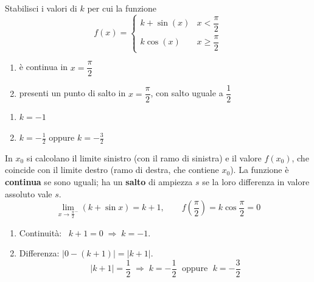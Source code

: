 \begin{question}[ID=4.5, subtitle={Continuità e salto di $f$ con $k+\sin x$ e $k\cos x$ in $x=\pi/2$}, tags={continuità, parametrico}, difficulty=media]
Stabilisci i valori di $k$ per cui la funzione
\[
f(x) = \begin{cases}
    k + \sin(x) & x < \dfrac{\pi}{2} \\
    k\cos(x) & x \ge \dfrac{\pi}{2}
\end{cases}
\]
\begin{enumerate}
\item è continua in $x=\dfrac{\pi}{2}$
\item presenti un punto di salto in $x=\dfrac{\pi}{2}$, con salto uguale a $\dfrac{1}{2}$
\end{enumerate}
\begin{solution}
\begin{enumerate}
    \item $k=-1$
    \item $k=-\tfrac12$ oppure $k=-\tfrac32$
\end{enumerate}
\end{solution}
\begin{explanation}
In $x_0$ si calcolano il limite sinistro (con il ramo di sinistra) e il valore $f(x_0)$, che coincide con il limite destro (ramo di destra, che contiene $x_0$). La funzione è \textbf{continua} se sono uguali; ha un \textbf{salto} di ampiezza $s$ se la loro differenza in valore assoluto vale $s$.
\[ \lim_{x\to\frac\pi2^-}(k+\sin x)=k+1, \qquad f\!\left(\dfrac\pi2\right)=k\cos\dfrac\pi2=0 \]
\begin{enumerate}
    \item Continuità: \ $k+1=0 \;\Rightarrow\; k=-1$.
    \item Differenza: $|0-(k+1)|=|k+1|$.
    \[ |k+1|=\dfrac12 \;\Rightarrow\; k=-\dfrac12 \;\text{ oppure }\; k=-\dfrac32 \]
\end{enumerate}
\end{explanation}
\end{question}


